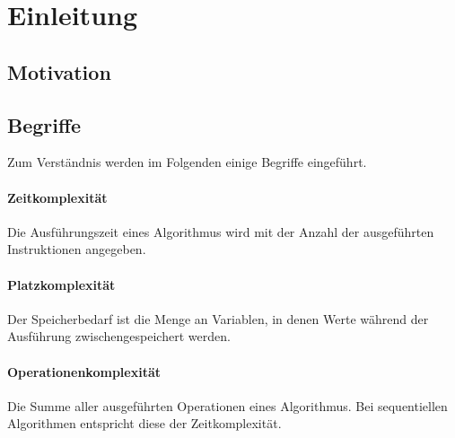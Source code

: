 \section{Einleitung}

\subsection{Motivation}

\subsection{Begriffe}
Zum Verständnis werden im Folgenden einige Begriffe eingeführt.

\paragraph{Zeitkomplexität}
Die Ausführungszeit eines Algorithmus wird mit der Anzahl der ausgeführten Instruktionen angegeben.

\paragraph{Platzkomplexität}
Der Speicherbedarf ist die Menge an Variablen, in denen Werte während der Ausführung zwischengespeichert werden.

\paragraph{Operationenkomplexität}
Die Summe aller ausgeführten Operationen eines Algorithmus. Bei sequentiellen Algorithmen entspricht diese der Zeitkomplexität.
